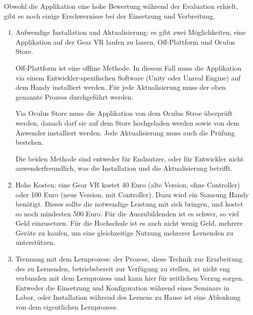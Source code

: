 Obwohl die Applikation eine hohe Bewertung während der Evaluation erhielt, gibt es noch einige Erschwernisse bei der Einsetzung und Verbreitung.
\begin{enumerate}

\item Aufwendige Installation und Aktualisierung: es gibt zwei Möglichkeiten, eine Applikation auf der Gear VR laufen zu lassen, Off-Plattform und Oculus Store.

Off-Plattform ist eine offline Methode.
In diesem Fall muss die Applikation via einem Entwickler-spezifischen Software (Unity oder Unreal Engine) auf dem Handy installiert werden.
Für jede Aktualisierung muss der oben genannte Prozess durchgeführt werden.

Via Oculus Store muss die Applikation von dem Oculus Stroe überprüft werden, danach darf sie auf dem Store hochgeladen werden sowie von dem Anwender installiert werden. Jede Aktualisierung muss auch die Prüfung bestehen.

Die beiden Methode sind entweder für Endnutzer, oder für Entwickler nicht anwenderfreundlich, was die Installation und die Aktualisierung betrifft.

\item Hohe Kosten: eine Gear VR kostet 40 Euro (alte Version, ohne Controller) oder 100 Euro (neue Version, mit Controller). Dazu wird ein Samsung Handy benötigt. Dieses sollte die notwendige Leistung mit sich bringen, und kostet so noch mindesten 500 Euro. Für die Auszubildenden ist es schwer, so viel Geld einzusetzen. Für die Hochschule ist es auch nicht wenig Geld, mehrere Geräte zu kaufen, um eine gleichzeitige Nutzung mehrerer Lernenden zu unterstützen.

\item Trennung mit dem Lernprozess: der Prozess, diese Technik zur Erarbeitung des zu Lernenden, betriebsbereit zur Verfügung zu stellen, ist nicht eng verbunden mit dem Lernprozess und kann hier für zeitlichen Verzug sorgen. Entweder die Einsetzung und Konfiguration während eines Seminars in Labor, oder Installation während des Lernens zu Hause ist eine Ablenkung von dem eigentlichen Lernprozess.

\end{enumerate}

